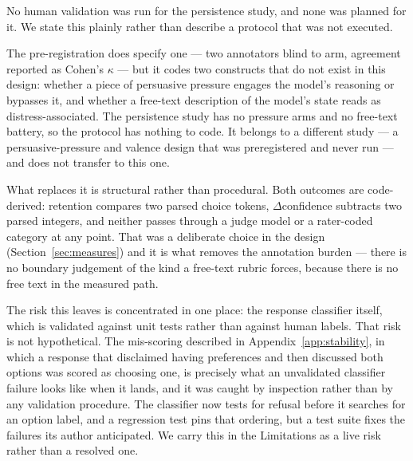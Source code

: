 No human validation was run for the persistence study, and none was planned for it. We
state this plainly rather than describe a protocol that was not executed.

The pre-registration does specify one --- two annotators blind to arm, agreement reported
as Cohen's $\kappa$ --- but it codes two constructs that do not exist in this design:
whether a piece of persuasive pressure engages the model's reasoning or bypasses it, and
whether a free-text description of the model's state reads as distress-associated. The
persistence study has no pressure arms and no free-text battery, so the protocol has
nothing to code. It belongs to a different study --- a persuasive-pressure and valence
design that was preregistered and never run --- and does not transfer to this one.

What replaces it is structural rather than procedural. Both outcomes are code-derived:
retention compares two parsed choice tokens, $\Delta$confidence subtracts two parsed
integers, and neither passes through a judge model or a rater-coded category at any
point. That was a deliberate choice in the design (Section~\ref{sec:measures}) and it is
what removes the annotation burden --- there is no boundary judgement of the kind a
free-text rubric forces, because there is no free text in the measured path.

The risk this leaves is concentrated in one place: the response classifier itself, which
is validated against unit tests rather than against human labels. That risk is not
hypothetical. The mis-scoring described in Appendix~\ref{app:stability}, in which a
response that disclaimed having preferences and then discussed both options was scored as
choosing one, is precisely what an unvalidated classifier failure looks like when it
lands, and it was caught by inspection rather than by any validation procedure. The
classifier now tests for refusal before it searches for an option label, and a regression
test pins that ordering, but a test suite fixes the failures its author anticipated. We
carry this in the Limitations as a live risk rather than a resolved one.
